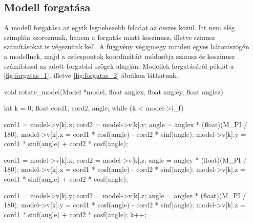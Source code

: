 	



\newpage
\subsection{Modell forgatása}
A modell forgatása az egyik legnehezebb feladat az összes közül. Itt nem elég szimplán szoroznunk, hanem a forgatás miatt koszinusz, illetve szinusz számításokat is végeznünk kell. A függvény végigmegy minden egyes háromszögén a modellnek, majd a csúcspontok koordinátáit módosítja szinusz és koszinusz számítással az adott forgatási szögek alapján. Modellek forgatásáról példát a \ref{fig:forgatas_1}, illetve \ref{fig:forgatas_2} ábrákon láthatunk.
\begin{cpp}
void rotate_model(Model *model, float anglex, float angley, float anglez)
{
    int k = 0;
    float cord1, cord2, angle;
    while (k < model->i_f)
    {
        cord1 = model->v[k].x;
        cord2 = model->v[k].y;
        angle = anglex * (float)(M_PI / 180);
        model->v[k].x = cord1 * cosf(angle) - cord2 * sinf(angle);
        model->v[k].y = cord1 * sinf(angle) + cord2 * cosf(angle);
			
        cord1 = model->v[k].x;
        cord2 = model->v[k].z;
        angle = angley * (float)(M_PI / 180);
        model->v[k].x = cord1 * cosf(angle) - cord2 * sinf(angle);
        model->v[k].z = cord1 * sinf(angle) + cord2 * cosf(angle);
			
        cord1 = model->v[k].y;
        cord2 = model->v[k].z;
        angle = anglez * (float)(M_PI / 180);
        model->v[k].y = cord1 * cosf(angle) - cord2 * sinf(angle);
        model->v[k].z = cord1 * sinf(angle) + cord2 * cosf(angle);
        k++;
    }
}
\end{cpp}



\newpage

